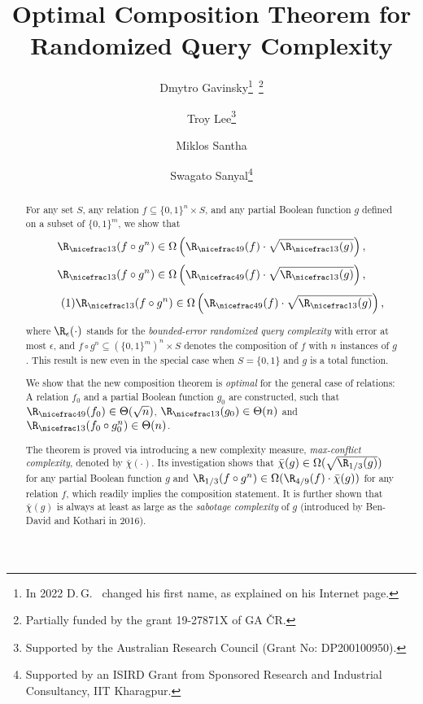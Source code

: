 \documentclass{toc}
\newcommand{\malabel}[1]{\addtocounter{equation}{1}\tag{\theequation}\label{#1}}
\newcommand{\m}[2][]{%
\ifthenelse{\equal{}{#1}}%
{\begin{align*} #2 \end{align*}}%
{\ifthenelse{\eq<ual{P}{#1}}%
{\begingroup\allowdisplaybreaks\begin{align*} #2%
\end{align*}\endgroup}%
{\begin{align*} \malabel{#1} #2 \end{align*}}%
}%
}
\newcommand{\dr}{\nicefrac}
\newcommand{\sq}{\sqrt}
\newcommand{\asT}[1]{\Theta(#1)}
\newcommand{\e}{\emph}
\newcommand{\ccc}{max-conflict complexity}
\begin{document}
\begin{frontmatter}%

%
%
%

%
\title{Optimal Composition Theorem for Randomized Query 
Complexity}


%
%

%
%
%
%
%
%

%
%
%
%
%
%
%
%
%
%
%
%


%
%
%
%

%

\author[Gavinsky]{Dmytro Gavinsky\footnote{In 2022 D.\,G.\ 
%
changed
%
%
his first name, as explained on his Internet page.
%
%
%
%
%
%
%
}~\thanks{Partially funded by the grant 19-27871X of GA \v{C}R.}}
\author[Lee]{Troy Lee\thanks{Supported by the Australian Research Council (Grant No: DP200100950).}}
\author[Santha]{Miklos Santha}
\author[Sanyal]{Swagato Sanyal\thanks{Supported by an ISIRD Grant from Sponsored Research and Industrial Consultancy, IIT Kharagpur.}}

%
%
%
%

%
%
%
%
%
%
%
%
\begin{abstract}
%
For any set $S$, any relation $f \subseteq \{0,1\}^n \times S$, and %
any partial Boolean function $g$ defined on a subset of $\{0,1\}^m$,
we show that
\m{
\R_{\dr13}(f \circ g^n) \in \Omega\left(\R_{\dr49}(f) \cdot \sqrt{\R_{\dr13}(g)}\right)
,}
where $\R_\epsilon(\cdot)$ stands for the \e{bounded-error randomized query complexity} with error at most $\epsilon$, and $f \circ g^n \subseteq \left(\{0,1\}^m\right)^n \times S$ denotes the composition of $f$ with $n$ instances of $g$.
%
This result is new even in the special case when $S=\{0,1\}$ and
$g$ is a total function.  %

We show that the new composition theorem is \e{optimal} for the general case of relations:
A relation $f_0$ and a partial Boolean function $g_0$ are constructed, such that $\R_{\dr49}(f_0)\in\asT{\sq n}$, $\R_{\dr13}(g_0)\in\asT{n}$ and $\R_{\dr13}(f_0\circ g_0^n)\in\asT{n}$.

The theorem is proved via introducing a new complexity measure, \emph{\ccc}, denoted by $\bar \chi(\cdot)$.
Its investigation shows that $\bar \chi(g) \in \Omega(\sqrt{\R_{1/3}(g)})$ for any partial Boolean function $g$ and $\R_{1/3}(f \circ g^n) \in \Omega(\R_{4/9}(f) \cdot \bar \chi(g))$ for any relation $f$, which readily implies the composition statement.
It is further shown that $\bar \chi(g)$ is always at least as large as the \emph{sabotage complexity} of $g$ (introduced by Ben-David and Kothari in 2016).  
\end{abstract}
%

\end{frontmatter}
\end{document}
